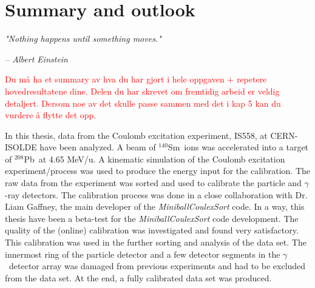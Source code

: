 \documentclass[twoside,english]{uiofysmaster/uiofysmaster}
\newcommand{\Sm}{$^{140}$Sm} %
\newcommand{\Pb}{$^{208}$Pb}
\newcommand{\ga}{$\gamma$}
\let\orgautoref\autoref
\renewcommand{\autoref}
        {%
		 \def\sectionautorefname{Section}%
		 \def\subsectionautorefname{Section}%
		 \def\subsubsectionautorefname{Section}%
		 \def\chapterautorefname{Chapter}%
          \orgautoref}
\begin{document}
\bigskip







\chapter{Summary and outlook}\label{ch:SO}
\epigraph{\textit{"Nothing happens until something moves."}}{\textit{– Albert Einstein}}


\textcolor{red}{Du må ha et summary av hva du har gjort i hele oppgaven + repetere hovedresultatene dine. Delen du har skrevet om fremtidig arbeid er veldig detaljert. Dersom noe av det skulle passe sammen med det i kap 5 kan du vurdere å flytte det opp.}



In this thesis, data from the Coulomb excitation experiment, IS558, at CERN-ISOLDE have been analyzed. 
A beam of \Sm\ ions was accelerated into a target of \Pb\ at 4.65 MeV/u. 
A kinematic simulation of the Coulomb excitation experiment/process was used to produce the energy input for the calibration.
The raw data from the experiment was sorted and used to calibrate the particle and \ga-ray detectors.
The calibration process was done in a close collaboration with Dr. Liam Gaffney, the main developer of the \textsl{MiniballCoulexSort} code.
In a way, this thesis have been a beta-test for the \textsl{MiniballCoulexSort} code development.
The quality of the (online) calibration was investigated and found very satisfactory. 
This calibration was used in the further sorting and analysis of the data set.
The innermost ring of the particle detector and a few detector segments in the \ga\ detector array was damaged from previous experiments and had to be excluded from the data set.
At the end, a fully calibrated data set was produced. 
\end{document}

